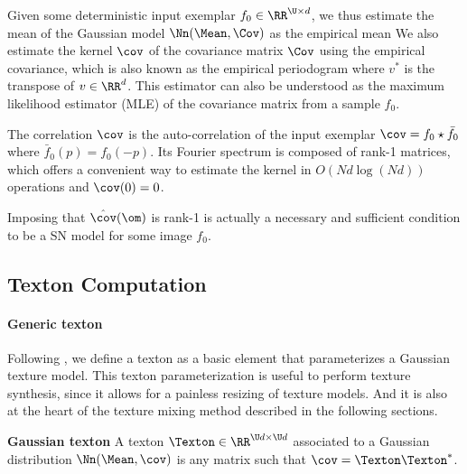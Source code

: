Given some deterministic input exemplar $f_0 \in \RR^{\U \times d}$, we thus estimate the mean of the Gaussian model $\Nn(\Mean,\Cov)$ as the empirical mean
We also estimate the kernel $\cov$ of the covariance matrix $\Cov$ using the empirical
covariance,
 which is also known as the empirical periodogram 
where $v^*$ is the transpose of $v \in \RR^d$. This estimator can also be understood as the maximum likelihood estimator (MLE) of the covariance matrix from a sample $f_0$.

The correlation $\cov$ is the auto-correlation of the input exemplar $\cov=f_0 \star \bar f_0$ where $\bar f_0(p) = f_0(-p)$. Its Fourier spectrum is composed of rank-1 matrices, which offers a convenient way to estimate the kernel in $O(Nd \log(Nd))$ operations
and $\cov(0) = 0$.

Imposing that $\hat \cov(\om)$ is rank-1 is actually a necessary and sufficient condition to be a SN model for some image $f_0$.



\subsection{Texton Computation}

\paragraph{Generic texton}

Following \cite{}, we define a texton as a basic element that parameterizes a Gaussian texture model. This texton parameterization is useful to perform texture synthesis, since it allows for a painless resizing of texture models. And it is also at the heart of the texture mixing method described in the following sections. 

\begin{definition}{\bf Gaussian texton}
\label{def-texton}
	A texton $\Texton \in \RR^{\U d \times \U d}$ associated to a Gaussian distribution $\Nn(\Mean,\cov)$ is any matrix such that $\cov = \Texton \Texton^*$.
\end{definition}


